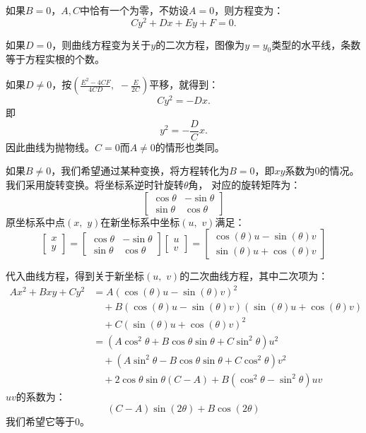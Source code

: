 \documentclass[12pt,UTF8,fontset=none]{ctexbook}
\begin{document}
如果$B = 0$，$A,C$中恰有一个为零，不妨设$A = 0$，则方程变为：
$$ Cy^2 + Dx + Ey + F = 0.$$

如果$D = 0$，则曲线方程变为关于$y$的二次方程，图像为$y = y_0$类型的水平线，条数等于方程实根的个数。

如果$D\neq 0$，按$\displaystyle\left(\frac{E^2 - 4CF}{4CD},\,\,-\frac{E}{2C}\right)$平移，就得到：
$$ Cy^2 = -Dx. $$
即
$$ y^2 = -\frac{D}{C}x. $$
因此曲线为抛物线。$C=0$而$A\neq 0$的情形也类同。

如果$B\neq 0$，我们希望通过某种变换，将方程转化为$B = 0$，即$xy$系数为$0$的情况。我们采用旋转变换。将坐标系逆时针旋转$\theta$角，
对应的旋转矩阵为：
$$
\begin{bmatrix}
    \cos{\theta} & -\sin{\theta} \\
    \sin{\theta} & \cos{\theta} 
\end{bmatrix}
$$
原坐标系中点$(x,\,\,y)$在新坐标系中坐标$(u,\,\,v)$满足：
$$
\begin{bmatrix}
    x \\ y
\end{bmatrix}
=
\begin{bmatrix}
    \cos{\theta} & -\sin{\theta} \\
    \sin{\theta} & \cos{\theta} 
\end{bmatrix}
\begin{bmatrix}
    u \\ v
\end{bmatrix}
= 
\begin{bmatrix}
    \cos{(\theta)}u - \sin{(\theta)}v \\ \sin{(\theta)}u + \cos{(\theta)}v
\end{bmatrix}
$$


代入曲线方程，得到关于新坐标$(u,\,\,v)$的二次曲线方程，其中二次项为：
\begin{align*}
    Ax^2 + Bxy + Cy^2 &= A(\cos{(\theta)}u - \sin{(\theta)}v)^2 \\
    &\quad + B(\cos{(\theta)}u - \sin{(\theta)}v)(\sin{(\theta)}u + \cos{(\theta)}v) \\
    &\quad + C(\sin{(\theta)}u + \cos{(\theta)}v)^2 \\
    &= (A\cos^2{\theta} + B\cos{\theta}\sin{\theta} + C\sin^2{\theta})u^2 \\
    &\quad + (A\sin^2{\theta} - B\cos{\theta}\sin{\theta} + C\cos^2{\theta})v^2 \\
    &\quad + 2\cos{\theta}\sin{\theta}(C - A) + B(\cos^2{\theta} - \sin^2{\theta})uv
\end{align*}
$uv$的系数为：
$$ (C - A)\sin{(2\theta)} + B\cos{(2\theta)} $$
我们希望它等于$0$。
\end{document}
